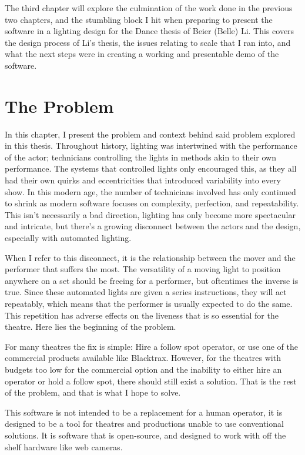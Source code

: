 \documentclass[
    12pt,
    twoside,
    bibstyle=chicago,
    headerstyle=uppercase,
	bibfile=biblatex_updating.bib
]{reedthesis}
\begin{document}
    The third chapter will explore the culmination of the work done in the previous two chapters, and the stumbling block I hit when preparing to present the software in a lighting design for the Dance thesis of Beier (Belle) Li. This covers the design process of Li's thesis, the issues relating to scale that I ran into, and what the next steps were in creating a working and presentable demo of the software.
	
\chapter{The Problem}

In this chapter, I present the problem and context behind said problem explored in this thesis. Throughout history, lighting was intertwined with the performance of the actor; technicians controlling the lights in methods akin to their own performance. The systems that controlled lights only encouraged this, as they all had their own quirks and eccentricities that introduced variability into every show. In this modern age, the number of technicians involved has only continued to shrink as modern software focuses on complexity, perfection, and repeatability. This isn't necessarily a bad direction, lighting has only become more spectacular and intricate, but there's a growing disconnect between the actors and the design, especially with automated lighting. 

When I refer to this disconnect, it is the relationship between the mover and the performer that suffers the most. The versatility of a moving light to position anywhere on a set should be freeing for a performer, but oftentimes the inverse is true. Since these automated lights are given a series instructions, they will act repeatably, which means that the performer is usually expected to do the same. This repetition has adverse effects on the liveness  that is so essential for the  theatre. Here lies the beginning of the problem.

For many theatres the fix is simple: Hire a follow spot operator, or use one of the commercial products available like Blacktrax. However, for the theatres with budgets too low for the commercial option and the inability to either hire an operator or hold a follow spot, there should still exist a solution. That is the rest of the problem, and that is what I hope to solve.

This software is not intended to be a replacement for a human operator, it is designed to be a tool for theatres and productions unable to use conventional solutions. It is software that is open-source, and designed to work with off the shelf hardware like web cameras.
\end{document}
